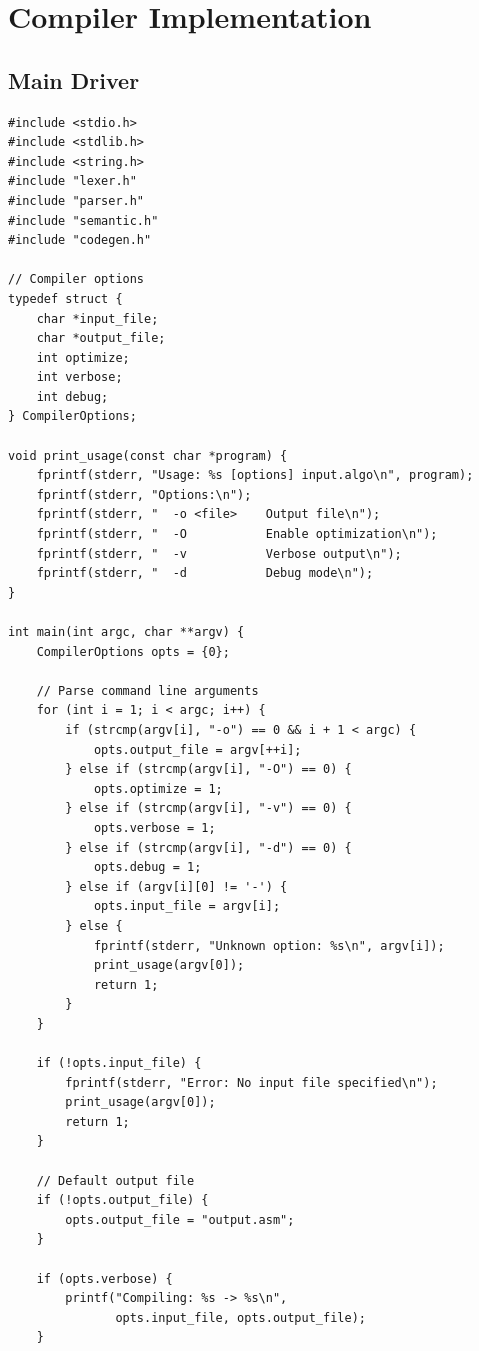 \documentclass[12pt,a4paper,oneside]{book}
\begin{document}
\section{Compiler Implementation}

\subsection{Main Driver}

\begin{lstlisting}[style=c, caption={compiler.c - Main Compiler Driver}]
#include <stdio.h>
#include <stdlib.h>
#include <string.h>
#include "lexer.h"
#include "parser.h"
#include "semantic.h"
#include "codegen.h"

// Compiler options
typedef struct {
    char *input_file;
    char *output_file;
    int optimize;
    int verbose;
    int debug;
} CompilerOptions;

void print_usage(const char *program) {
    fprintf(stderr, "Usage: %s [options] input.algo\n", program);
    fprintf(stderr, "Options:\n");
    fprintf(stderr, "  -o <file>    Output file\n");
    fprintf(stderr, "  -O           Enable optimization\n");
    fprintf(stderr, "  -v           Verbose output\n");
    fprintf(stderr, "  -d           Debug mode\n");
}

int main(int argc, char **argv) {
    CompilerOptions opts = {0};
    
    // Parse command line arguments
    for (int i = 1; i < argc; i++) {
        if (strcmp(argv[i], "-o") == 0 && i + 1 < argc) {
            opts.output_file = argv[++i];
        } else if (strcmp(argv[i], "-O") == 0) {
            opts.optimize = 1;
        } else if (strcmp(argv[i], "-v") == 0) {
            opts.verbose = 1;
        } else if (strcmp(argv[i], "-d") == 0) {
            opts.debug = 1;
        } else if (argv[i][0] != '-') {
            opts.input_file = argv[i];
        } else {
            fprintf(stderr, "Unknown option: %s\n", argv[i]);
            print_usage(argv[0]);
            return 1;
        }
    }
    
    if (!opts.input_file) {
        fprintf(stderr, "Error: No input file specified\n");
        print_usage(argv[0]);
        return 1;
    }
    
    // Default output file
    if (!opts.output_file) {
        opts.output_file = "output.asm";
    }
    
    if (opts.verbose) {
        printf("Compiling: %s -> %s\n", 
               opts.input_file, opts.output_file);
    }
    

\end{lstlisting}
\end{document}
